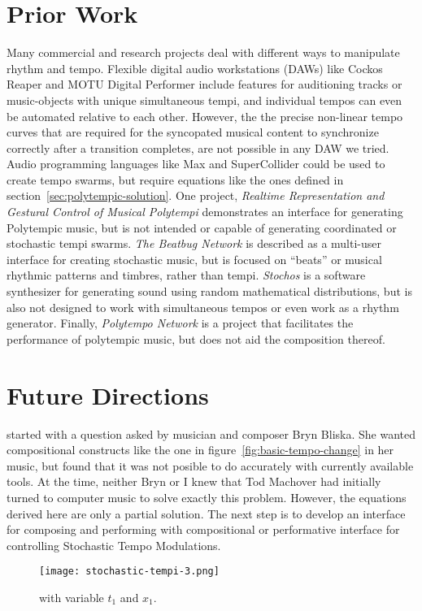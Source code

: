 \section{Prior Work}
\label{sec:polytempic-prior-work}
Many commercial and research projects deal with different ways to
manipulate rhythm and tempo. Flexible digital audio workstations (DAWs)
like Cockos Reaper and MOTU
Digital
Performer
include features for auditioning tracks or music-objects with unique
simultaneous tempi, and individual tempos can even be automated
relative to each other. However, the the precise non-linear tempo
curves that are required for the syncopated musical content to
synchronize correctly after a transition completes, are not possible in
any DAW we tried. Audio programming languages like
Max and
SuperCollider could be used
to create tempo swarms, but require equations like the ones defined in
section~\ref{sec:polytempic-solution}. One project, \textit{Realtime
  Representation and Gestural Control of Musical
  Polytempi}\cite{Nash2008} demonstrates an interface for generating
Polytempic music, but is not intended or capable of generating
coordinated or stochastic tempi swarms.  \textit{The Beatbug
  Network}\cite{Weinberg2002} is described as a multi-user interface
for creating stochastic music, but is focused on ``beats'' or musical
rhythmic patterns and timbres, rather than
tempi. \textit{Stochos}\cite{Bokesoy2003} is a software synthesizer
for generating sound using random mathematical distributions, but is
also not designed to work with simultaneous tempos or even work as a
rhythm generator. Finally, \textit{Polytempo Network}\cite{Kocher2014}
is a project that facilitates the performance of polytempic music, but
does not aid the composition thereof.

\section{Future Directions}
\label{sec:polytempic-future-directions}
\polytempic started with a question asked by musician and composer
Bryn Bliska. She wanted compositional constructs like the one in
figure~\ref{fig:basic-tempo-change} in her music, but found that it
was not posible to do accurately with currently available tools. At
the time, neither Bryn or I knew that Tod Machover had initially
turned to computer music to solve exactly this problem.  However, the
equations derived here are only a partial solution. The next step is
to develop an interface for composing and performing with
compositional or performative interface for controlling Stochastic
Tempo Modulations.

\begin{figure*}[]
  \texttt{[image: stochastic-tempi-3.png]}
  \caption{\polytempic with variable $t_1$ and $x_1$.}
  \label{fig:polytempic-transition-3}
\end{figure*}


